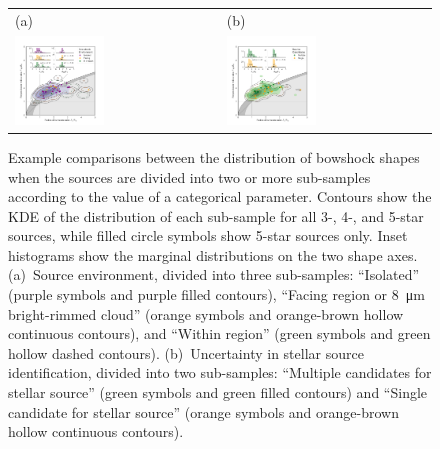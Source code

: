 \begin{figure}
  \centering
  \begin{tabular}{ll}
    (a) & (b) \\
    \includegraphics[width=0.45\textwidth]{figs/mipsgal-Rc-R90-environment} &
    \includegraphics[width=0.45\textwidth]{figs/mipsgal-Rc-R90-candidates} 
  \end{tabular}
  \caption[]{Example comparisons between the distribution of bowshock
    shapes when the sources are divided into two or more sub-samples
    according to the value of a categorical parameter.  Contours show
    the KDE of the distribution of each sub-sample for all 3-, 4-, and
    5-star sources, while filled circle symbols show 5-star sources
    only. Inset histograms show the marginal distributions on the two
    shape axes. (a)~Source environment, divided into three
    sub-samples: ``Isolated'' (purple symbols and purple filled
    contours), ``Facing \hii{} region or \SI{8}{\um} bright-rimmed
    cloud'' (orange symbols and orange-brown hollow continuous
    contours), and ``Within \hii{} region'' (green symbols and green
    hollow dashed contours). (b)~Uncertainty in stellar source
    identification, divided into two sub-samples: ``Multiple
    candidates for stellar source'' (green symbols and green filled
    contours) and ``Single candidate for stellar source'' (orange
    symbols and orange-brown hollow continuous contours).}
  \label{fig:mipsgal-uncorrelated}
\end{figure}

